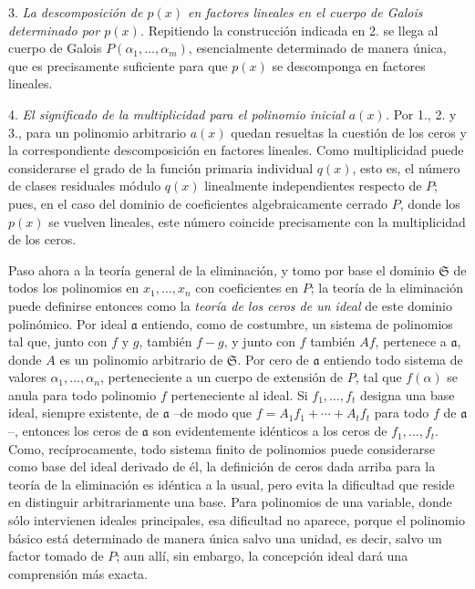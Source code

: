\documentclass[11pt]{article}
\begin{document}
3. \emph{La descomposición de $p(x)$ en factores lineales en el cuerpo de Galois determinado por $p(x)$.} Repitiendo la construcción indicada en 2. se llega al cuerpo de Galois $P(\alpha_1,\ldots,\alpha_m)$, esencialmente determinado de manera única, que es precisamente suficiente para que $p(x)$ se descomponga en factores lineales.

4. \emph{El significado de la multiplicidad para el polinomio inicial $a(x)$.} Por 1., 2. y 3., para un polinomio arbitrario $a(x)$ quedan resueltas la cuestión de los ceros y la correspondiente descomposición en factores lineales. Como multiplicidad puede considerarse el grado de la función primaria individual $q(x)$, esto es, el número de clases residuales módulo $q(x)$ linealmente independientes respecto de $P$; pues, en el caso del dominio de coeficientes algebraicamente cerrado $P$, donde los $p(x)$ se vuelven lineales, este número coincide precisamente con la multiplicidad de los ceros.

Paso ahora a la teoría general de la eliminación, y tomo por base el dominio $\mathfrak S$ de todos los polinomios en $x_1,\ldots,x_n$ con coeficientes en $P$; la teoría de la eliminación puede definirse entonces como la \emph{teoría de los ceros de un ideal} de este dominio polinómico. Por ideal $\mathfrak a$ entiendo, como de costumbre, un sistema de polinomios tal que, junto con $f$ y $g$, también $f-g$, y junto con $f$ también $Af$, pertenece a $\mathfrak a$, donde $A$ es un polinomio arbitrario de $\mathfrak S$. Por cero de $\mathfrak a$ entiendo todo sistema de valores $\alpha_1,\ldots,\alpha_n$, perteneciente a un cuerpo de extensión de $P$, tal que $f(\alpha)$ se anula para todo polinomio $f$ perteneciente al ideal. Si $f_1,\ldots,f_t$ designa una base ideal, siempre existente, de $\mathfrak a$ --de modo que $f=A_1f_1+\cdots+A_tf_t$ para todo $f$ de $\mathfrak a$--, entonces los ceros de $\mathfrak a$ son evidentemente idénticos a los ceros de $f_1,\ldots,f_t$. Como, recíprocamente, todo sistema finito de polinomios puede considerarse como base del ideal derivado de él, la definición de ceros dada arriba para la teoría de la eliminación es idéntica a la usual, pero evita la dificultad que reside en distinguir arbitrariamente una base. Para polinomios de una variable, donde sólo intervienen ideales principales, esa dificultad no aparece, porque el polinomio básico está determinado de manera única salvo una unidad, es decir, salvo un factor tomado de $P$; aun allí, sin embargo, la concepción ideal dará una comprensión más exacta.
\end{document}
